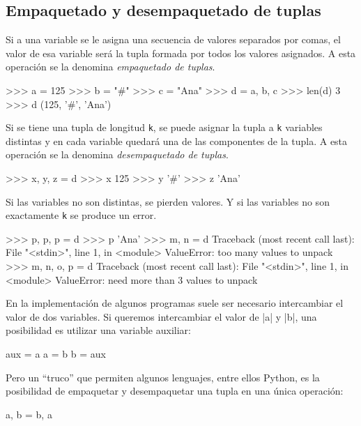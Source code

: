 \subsection{Empaquetado y desempaquetado de tuplas}
Si a una variable se le asigna una secuencia de valores separados por comas,
el valor de esa variable será la tupla formada por todos los valores asignados.
A esta operación se la denomina {\it empaquetado de tuplas}.

\begin{codigo-python-sn}
>>> a = 125
>>> b = "#"
>>> c = "Ana"
>>> d = a, b, c
>>> len(d)
3
>>> d
(125, '#', 'Ana')
\end{codigo-python-sn}

Si se tiene una tupla de longitud \lstinline+k+, se puede asignar
la tupla a \lstinline+k+ variables distintas y en cada variable quedará
una de las componentes de la tupla. A esta operación se la denomina
{\it desempaquetado de tuplas}.

\begin{codigo-python-sn}
>>> x, y, z = d
>>> x
125
>>> y
'#'
>>> z
'Ana'
\end{codigo-python-sn}

\begin{atencion}
Si las variables no son distintas, se pierden valores. Y si las variables
no son exactamente \lstinline+k+ se produce un error.

\begin{codigo-python-sn}
>>> p, p, p = d
>>> p
'Ana'
>>> m, n = d
Traceback (most recent call last):
  File "<stdin>", line 1, in <module>
ValueError: too many values to unpack
>>> m, n, o, p = d
Traceback (most recent call last):
  File "<stdin>", line 1, in <module>
ValueError: need more than 3 values to unpack
\end{codigo-python-sn}
\end{atencion}

\begin{sabias_que}
En la implementación de algunos programas suele ser necesario intercambiar el
valor de dos variables. Si queremos intercambiar el valor de |a| y |b|, una
posibilidad es utilizar una variable auxiliar:

\begin{codigo-python-sn}
aux = a
a = b
b = aux
\end{codigo-python-sn}

Pero un ``truco'' que permiten algunos lenguajes, entre ellos Python, es la
posibilidad de empaquetar y desempaquetar una tupla en una única operación:

\begin{codigo-python-sn}
a, b = b, a
\end{codigo-python-sn}
\end{sabias_que}


